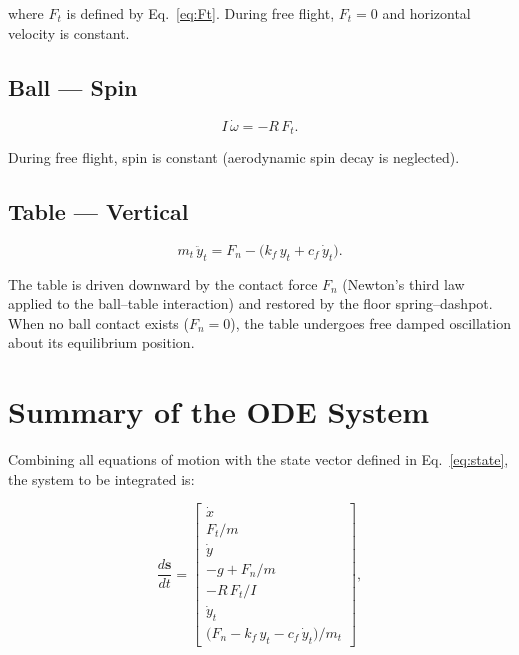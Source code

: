 \documentclass[11pt,a4paper]{article}
\begin{document}
where $F_t$ is defined by Eq.~\eqref{eq:Ft}. During free flight, $F_t = 0$
and horizontal velocity is constant.

\subsection{Ball --- Spin}

\begin{equation}
  I\,\dot{\omega} = -R\,F_t.
  \label{eq:ball_spin}
\end{equation}

During free flight, spin is constant (aerodynamic spin decay is neglected).

\subsection{Table --- Vertical}

\begin{equation}
  m_t\,\ddot{y}_t = F_n - \bigl(k_f\,y_t + c_f\,\dot{y}_t\bigr).
  \label{eq:table_vert}
\end{equation}

The table is driven downward by the contact force $F_n$ (Newton's third law
applied to the ball--table interaction) and restored by the floor
spring--dashpot. When no ball contact exists ($F_n = 0$), the table undergoes
free damped oscillation about its equilibrium position.

\section{Summary of the ODE System}

Combining all equations of motion with the state vector defined in
Eq.~\eqref{eq:state}, the system to be integrated is:

\begin{equation}
  \frac{d\mathbf{s}}{dt} =
  \begin{bmatrix}
    \dot{x} \\[4pt]
    F_t / m \\[4pt]
    \dot{y} \\[4pt]
    -g + F_n / m \\[4pt]
    -R\,F_t / I \\[4pt]
    \dot{y}_t \\[4pt]
    \bigl(F_n - k_f\,y_t - c_f\,\dot{y}_t\bigr) / m_t
  \end{bmatrix},
  \label{eq:ode_system}
\end{equation}
\end{document}
